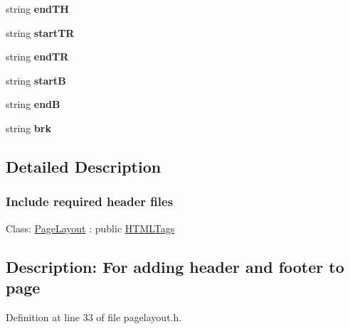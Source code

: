 \begin{DoxyCompactItemize}
\item 
\hypertarget{classHTMLTags_a12cc718fee6ac4d701aafa9bc6303ad3}{string {\bfseries end\-T\-H}}\label{classHTMLTags_a12cc718fee6ac4d701aafa9bc6303ad3}

\item 
\hypertarget{classHTMLTags_ae8ee5ce9589d18b36263d62c6aa30e0a}{string {\bfseries start\-T\-R}}\label{classHTMLTags_ae8ee5ce9589d18b36263d62c6aa30e0a}

\item 
\hypertarget{classHTMLTags_ae6b79efff5ed7c253a050a6179057942}{string {\bfseries end\-T\-R}}\label{classHTMLTags_ae6b79efff5ed7c253a050a6179057942}

\item 
\hypertarget{classHTMLTags_ac6dafb63a2da3f7500cc080fd43a324d}{string {\bfseries start\-B}}\label{classHTMLTags_ac6dafb63a2da3f7500cc080fd43a324d}

\item 
\hypertarget{classHTMLTags_a12fc9d60d71c585cfba1643dc93eb8fc}{string {\bfseries end\-B}}\label{classHTMLTags_a12fc9d60d71c585cfba1643dc93eb8fc}

\item 
\hypertarget{classHTMLTags_a4403658fc74b6064bac61b0785ff0e85}{string {\bfseries brk}}\label{classHTMLTags_a4403658fc74b6064bac61b0785ff0e85}

\end{DoxyCompactItemize}


\subsection{Detailed Description}


 \subsubsection*{Include required header files}



 Class\-: \hyperlink{classPageLayout}{Page\-Layout} \-: public \hyperlink{classHTMLTags}{H\-T\-M\-L\-Tags} \subsection*{Description\-: For adding header and footer to page}

Definition at line 33 of file pagelayout.\-h.



